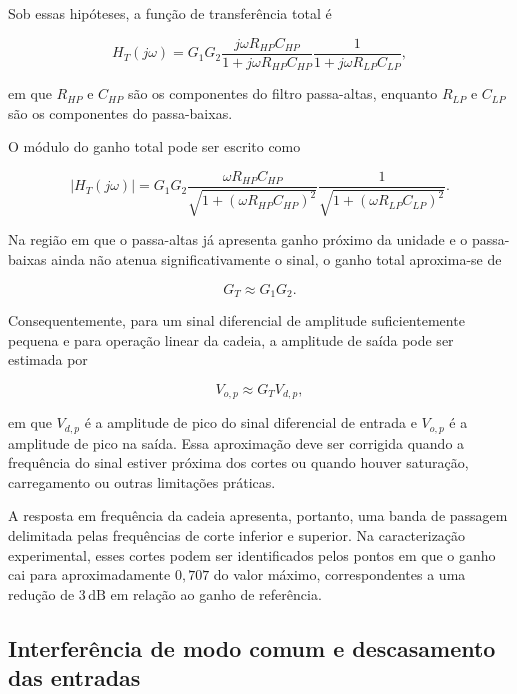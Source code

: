\documentclass[11pt,a4paper]{article}
\begin{document}
Sob essas hipóteses, a função de transferência total é

\begin{equation}
H_T(j\omega)
=
G_1G_2
\frac{j\omega R_{HP}C_{HP}}
{1+j\omega R_{HP}C_{HP}}
\frac{1}{1+j\omega R_{LP}C_{LP}},
\label{eq:funcao_transferencia_total}
\end{equation}

em que $R_{HP}$ e $C_{HP}$ são os componentes do filtro passa-altas, enquanto $R_{LP}$ e $C_{LP}$ são os componentes do passa-baixas.

O módulo do ganho total pode ser escrito como

\begin{equation}
|H_T(j\omega)|
=
G_1G_2
\frac{\omega R_{HP}C_{HP}}
{\sqrt{1+(\omega R_{HP}C_{HP})^2}}
\frac{1}
{\sqrt{1+(\omega R_{LP}C_{LP})^2}}.
\label{eq:ganho_total_modulo}
\end{equation}

Na região em que o passa-altas já apresenta ganho próximo da unidade e o passa-baixas ainda não atenua significativamente o sinal, o ganho total aproxima-se de

\begin{equation}
G_T\approx G_1G_2.
\label{eq:ganho_total}
\end{equation}

Consequentemente, para um sinal diferencial de amplitude suficientemente pequena e para operação linear da cadeia, a amplitude de saída pode ser estimada por

\begin{equation}
V_{o,p}\approx G_TV_{d,p},
\label{eq:amplitude_saida}
\end{equation}

em que $V_{d,p}$ é a amplitude de pico do sinal diferencial de entrada e $V_{o,p}$ é a amplitude de pico na saída. Essa aproximação deve ser corrigida quando a frequência do sinal estiver próxima dos cortes ou quando houver saturação, carregamento ou outras limitações práticas.

A resposta em frequência da cadeia apresenta, portanto, uma banda de passagem delimitada pelas frequências de corte inferior e superior. Na caracterização experimental, esses cortes podem ser identificados pelos pontos em que o ganho cai para aproximadamente $0{,}707$ do valor máximo, correspondentes a uma redução de $3\,\mathrm{dB}$ em relação ao ganho de referência.

\subsection{Interferência de modo comum e descasamento das entradas}
\label{sec:interferencia-modo-comum}
\end{document}
